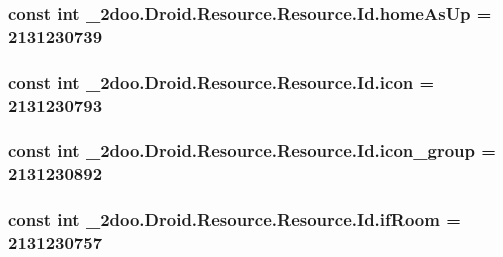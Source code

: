 \hypertarget{class__2doo_1_1_droid_1_1_resource_1_1_id_578c6f3040008bca2baa034ab1aac82c}{
\subsubsection[{homeAsUp}]{\setlength{\rightskip}{0pt plus 5cm}const int \_\-2doo.Droid.Resource.Resource.Id.homeAsUp = 2131230739}}
\label{class__2doo_1_1_droid_1_1_resource_1_1_id_578c6f3040008bca2baa034ab1aac82c}


\hypertarget{class__2doo_1_1_droid_1_1_resource_1_1_id_a332f7f0bcdade9bb195d6ec49fec777}{
\subsubsection[{icon}]{\setlength{\rightskip}{0pt plus 5cm}const int \_\-2doo.Droid.Resource.Resource.Id.icon = 2131230793}}
\label{class__2doo_1_1_droid_1_1_resource_1_1_id_a332f7f0bcdade9bb195d6ec49fec777}


\hypertarget{class__2doo_1_1_droid_1_1_resource_1_1_id_c6b511946199513303ef34d42a62ec86}{
\subsubsection[{icon\_\-group}]{\setlength{\rightskip}{0pt plus 5cm}const int \_\-2doo.Droid.Resource.Resource.Id.icon\_\-group = 2131230892}}
\label{class__2doo_1_1_droid_1_1_resource_1_1_id_c6b511946199513303ef34d42a62ec86}


\hypertarget{class__2doo_1_1_droid_1_1_resource_1_1_id_8c6bd72edf0801ec19bcd0910d2c5613}{
\subsubsection[{ifRoom}]{\setlength{\rightskip}{0pt plus 5cm}const int \_\-2doo.Droid.Resource.Resource.Id.ifRoom = 2131230757}}
\label{class__2doo_1_1_droid_1_1_resource_1_1_id_8c6bd72edf0801ec19bcd0910d2c5613}


